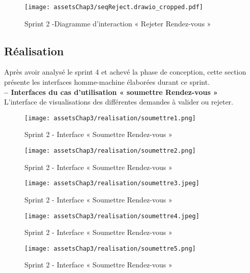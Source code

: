 \begin{figure}[H]
\centering
\texttt{[image: assetsChap3/seqReject.drawio\_cropped.pdf]}
\caption{ Sprint 2 -Diagramme d’interaction « Rejeter Rendez-vous » }
\end{figure}




\subsection{Réalisation}
Après avoir analysé le sprint 4 et achevé la phase de conception, cette section présente les interfaces homme-machine élaborées durant ce sprint.\\


\textbf{– Interfaces du cas d'utilisation « soumettre  Rendez-vous »}\\
L'interface de visualisations des différentes demandes à valider ou rejeter.
\begin{figure}[H]
\centering
\texttt{[image: assetsChap3/realisation/soumettre1.png]}
\caption{ Sprint 2 - Interface « Soumettre Rendez-vous » }
\end{figure}

\begin{figure}[H]
\centering
\texttt{[image: assetsChap3/realisation/soumettre2.png]}
\caption{ Sprint 2 - Interface « Soumettre Rendez-vous » }
\end{figure}

\begin{figure}[H]
\centering
\texttt{[image: assetsChap3/realisation/soumettre3.jpeg]}
\caption{ Sprint 2 - Interface « Soumettre Rendez-vous » }
\end{figure}

\begin{figure}[H]
\centering
\texttt{[image: assetsChap3/realisation/soumettre4.jpeg]}
\caption{ Sprint 2 - Interface « Soumettre Rendez-vous » }
\end{figure}

\begin{figure}[H]
\centering
\texttt{[image: assetsChap3/realisation/soumettre5.png]}
\caption{ Sprint 2 - Interface « Soumettre Rendez-vous » }
\end{figure}













